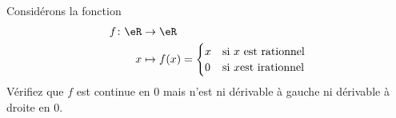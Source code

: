 
\begin{exercice}\label{exo0040}

Considérons la fonction
\begin{equation}
	\begin{aligned}
		f\colon \eR&\to \eR \\
		x&\mapsto f(x)=\begin{cases}
            x	&	\text{si }x \text{ est rationnel}\\
            0	&	 \text{si }x \text{est irationnel}
\end{cases}
	\end{aligned}
\end{equation}
Vérifiez que $f$ est continue en $0$ mais n'est ni dérivable à  gauche ni dérivable à droite en $0$.

\end{exercice}
